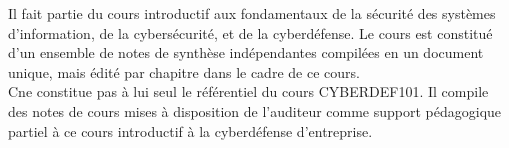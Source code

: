 

Il fait partie du cours introductif aux fondamentaux de la sécurité des systèmes d'information, de la cybersécurité, et de la cyberdéfense.
Le cours est constitué d'un ensemble de notes de synthèse indépendantes compilées en un document unique, mais édité par chapitre dans le cadre de ce cours.\\
C\edoc ne constitue pas à lui seul le référentiel du cours CYBERDEF101. Il compile des notes de cours mises à disposition de l'auditeur comme support pédagogique partiel à ce cours introductif à la cyberdéfense d'entreprise.